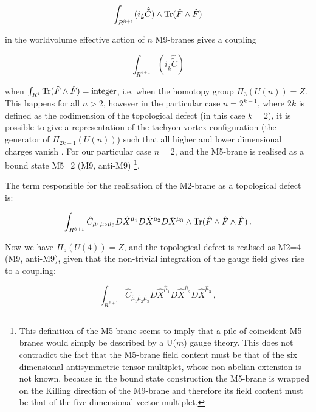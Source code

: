 \documentclass[12pt,a4paper]{article}
\begin{document}
\begin{equation}
\int_{R^{8+1}}(i_{\hat k}{\hat {\tilde C}})\wedge {\rm Tr}({\hat F}\wedge
{\hat F})
\end{equation}

\noindent in the worldvolume effective action of $n$ M9-branes
gives a coupling

\begin{equation}
\int_{R^{4+1}}(i_{\hat k}{\hat {\tilde C}})
\end{equation}

\noindent when
$\int_{R^4}{\rm Tr}({\hat F} \wedge {\hat F})={\rm integer}$,
i.e. when the homotopy group $\Pi_3(U(n))=Z$. This happens 
for all $n>2$, however in the particular
case $n=2^{k-1}$, where $2k$ is defined as the codimension of the
topological defect (in this case $k=2$), it is possible to give a 
representation of the tachyon vortex configuration (the generator of
$\Pi_{2k-1}(U(n))$) such that all higher and lower dimensional charges
vanish \cite{Witten}.
For our particular case $n=2$, and the 
M5-brane is realised as a bound state 
M5=2 (M9, anti-M9) \footnote{This definition
of the M5-brane seems to imply 
that a pile of coincident M5-branes would simply be described by a U($m$) gauge
theory. This does not contradict the fact that the M5-brane field
content must be that of the six dimensional antisymmetric tensor
multiplet, whose non-abelian extension is not known, because 
in the bound state construction the
M5-brane is wrapped on the Killing direction of the M9-brane
and therefore its field content must be that of the five dimensional vector
multiplet.}.

The term responsible for the realisation of the M2-brane as a 
topological defect is: 

\begin{equation}
\int_{R^{8+1}} {\hat C}_{{\hat \mu}_1{\hat \mu}_2{\hat \mu}_3}
D{\hat X}^{{\hat \mu}_1}D{\hat X}^{{\hat \mu}_2}D{\hat X}^{{\hat \mu}_3}
\wedge {\rm Tr}({\hat F}\wedge {\hat F}\wedge {\hat F})\, .
\end{equation}

\noindent Now we have $\Pi_5(U(4))=Z$, and the topological defect
is realised as M2=4 (M9, anti-M9), given that the non-trivial integration
of the gauge field gives rise to a coupling:

\begin{equation}
\int_{R^{2+1}}{\hat C}_{{\hat \mu}_1{\hat \mu}_2{\hat \mu}_3}
D{\hat X}^{{\hat \mu}_1}D{\hat X}^{{\hat \mu}_2}
D{\hat X}^{{\hat \mu}_3}\, ,
\end{equation}
\end{document}
